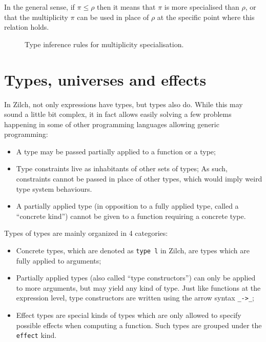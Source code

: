 In the general sense, if $\pi \leqslant \rho$ then it means that $\pi$ is more specialised than $\rho$, or that the multiplicity $\pi$ can be used in place of $\rho$ at the specific point where this relation holds.

\begin{figure}[H]
	\centering


	\caption{Type inference rules for multiplicity specialisation.}
	\label{fig:zilch-staticsem-multiplicities-conv-typerules}
\end{figure}

\section{Types, universes and effects}\label{sec:zilch-staticsem-types}

In Zilch, not only expressions have types, but types also do.
While this may sound a little bit complex, it in fact allows easily solving a few problems happening in some of other programming languages allowing generic programming:
\begin{itemize}
	\item A type may be passed partially applied to a function or a type;
	\item Type constraints live as inhabitants of other sets of types;
	      As such, constraints cannot be passed in place of other types, which would imply weird type system behaviours.
	\item A partially applied type (in opposition to a fully applied type, called a ``concrete kind'') cannot be given to a function requiring a concrete type.
\end{itemize}

Types of types are mainly organized in 4 categories:
\begin{itemize}
	\item Concrete types, which are denoted as \verb|type l| in Zilch, are types which are fully applied to arguments;
	\item Partially applied types (also called ``type constructors'') can only be applied to more arguments, but may yield any kind of type.
	      Just like functions at the expression level, type constructors are written using the arrow syntax \verb|_->_|;
	\item Effect types are special kinds of types which are only allowed to specify possible effects when computing a function.
	      Such types are grouped under the \verb|effect| kind.
\end{itemize}

